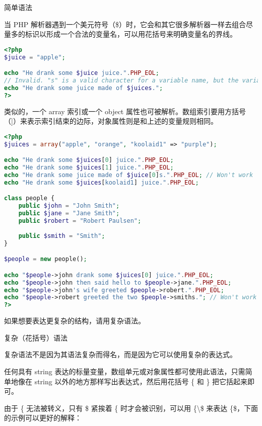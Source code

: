 \begin{compactitem}
\item 简单语法

当 PHP 解析器遇到一个美元符号（\$）时，它会和其它很多解析器一样去组合尽量多的标识以形成一个合法的变量名，可以用花括号来明确变量名的界线。

\begin{lstlisting}[language=PHP]
<?php
$juice = "apple";

echo "He drank some $juice juice.".PHP_EOL;
// Invalid. "s" is a valid character for a variable name, but the variable is $juice.
echo "He drank some juice made of $juices.";
?>
\end{lstlisting}

类似的，一个 array 索引或一个 object 属性也可被解析。数组索引要用方括号（]）来表示索引结束的边际，对象属性则是和上述的变量规则相同。

\begin{lstlisting}[language=PHP]
<?php
$juices = array("apple", "orange", "koolaid1" => "purple");

echo "He drank some $juices[0] juice.".PHP_EOL;
echo "He drank some $juices[1] juice.".PHP_EOL;
echo "He drank some juice made of $juice[0]s.".PHP_EOL; // Won't work
echo "He drank some $juices[koolaid1] juice.".PHP_EOL;

class people {
    public $john = "John Smith";
    public $jane = "Jane Smith";
    public $robert = "Robert Paulsen";
    
    public $smith = "Smith";
}

$people = new people();

echo "$people->john drank some $juices[0] juice.".PHP_EOL;
echo "$people->john then said hello to $people->jane.".PHP_EOL;
echo "$people->john's wife greeted $people->robert.".PHP_EOL;
echo "$people->robert greeted the two $people->smiths."; // Won't work
?>
\end{lstlisting}

如果想要表达更复杂的结构，请用复杂语法。

\item 复杂（花括号）语法

复杂语法不是因为其语法复杂而得名，而是因为它可以使用复杂的表达式。

任何具有 string 表达的标量变量，数组单元或对象属性都可使用此语法，只需简单地像在 string 以外的地方那样写出表达式，然后用花括号 \{ 和 \} 把它括起来即可。

由于 \{ 无法被转义，只有 \$ 紧挨着 \{ 时才会被识别，可以用 \{\textbackslash \$ 来表达 \{\$，下面的示例可以更好的解释：


\end{compactitem}
